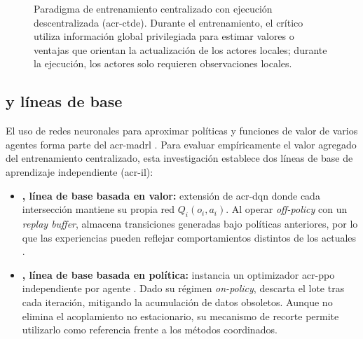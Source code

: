 \begin{figure}[!htbp]
{%
    }
    \caption[Paradigma de entrenamiento centralizado con ejecución descentralizada (CTDE)]{Paradigma de entrenamiento centralizado con ejecución descentralizada (\acrshort{acr-ctde}). Durante el entrenamiento, el crítico utiliza información global privilegiada para estimar valores o ventajas que orientan la actualización de los actores locales; durante la ejecución, los actores solo requieren observaciones locales.}
    \label{fig:ctde_architecture}
\end{figure}

\subsection[MADRL y líneas de base]{ y líneas de base}

El uso de redes neuronales para aproximar políticas y funciones de valor de varios agentes forma parte del \acrshort{acr-madrl} \cite{maddpg}. Para evaluar empíricamente el valor agregado del entrenamiento centralizado, esta investigación establece dos líneas de base de aprendizaje independiente (\acrshort{acr-il}):

\begin{itemize}
    \item \textbf{, línea de base basada en valor:} extensión de \acrshort{acr-dqn} donde cada intersección mantiene su propia red $Q_i(o_i, a_i)$. Al operar \textit{off-policy} con un \textit{replay buffer}, almacena transiciones generadas bajo políticas anteriores, por lo que las experiencias pueden reflejar comportamientos distintos de los actuales \cite{foerster2017}.
    \item \textbf{, línea de base basada en política:} instancia un optimizador \acrshort{acr-ppo} independiente por agente \cite{de2020independent}. Dado su régimen \textit{on-policy}, descarta el lote tras cada iteración, mitigando la acumulación de datos obsoletos. Aunque no elimina el acoplamiento no estacionario, su mecanismo de recorte permite utilizarlo como referencia frente a los métodos coordinados.
\end{itemize}


